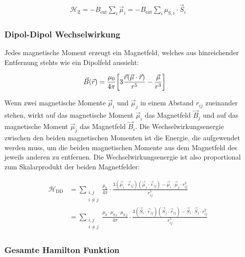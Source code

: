 \documentclass[main.tex]{subfiles}
\begin{document}
\begin{align}
	\mathcal{H}_{\text{Z}} = - B_\text{ext} \sum_{i} \vec{\mu}_i = -
	B_\text{ext} \sum_{i} \mu_{\text{S},i} \cdot \vec{S}_i\label{eq:hamilton-zeeman}
\end{align}

\subsubsection*{Dipol-Dipol Wechselwirkung}

Jedes magnetische Moment erzeugt ein Magnetfeld, welches aus hinreichender
Entfernung stehts wie ein Dipolfeld aussieht:

\begin{align}
	\vec{B}(\vec{r}) & = \frac{\mu_0}{4\pi} \qty[3 \frac{\vec{r}(\vec{\mu}
			\cdot
			\vec{r})}{r^5} -
		\frac{\vec{\mu}}{r^3}]\label{eq:dipolmoment}
\end{align}\cite{Nolting-3-elektrodynamik}

Wenn zwei magnetische Momente \(\vec{\mu}_i\) und \(\vec{\mu}_j\) in einem
Abstand \(r_{ij}\) zueinander stehen, wirkt auf das magnetische Moment
\(\vec{\mu}_i\) das Magnetfeld \(\vec{B}_j\) und auf das magnetische Moment
\(\vec{\mu}_j\) das Magnetfeld \(\vec{B}_i\). Die Wechselwirkungsenergie
zwischen den beiden magnetischen Momenten ist die Energie, die aufgewendet
werden muss, um die beiden magnetischen Momente aus dem Magnetfeld des jeweils
anderen zu entfernen. Die Wechselwirkungsenergie ist also proportional zum
Skalarprodukt der beiden Magnetfelder:

\begin{align}
	\mathcal{H}_{\text{DD}} & = \sum_{\substack{i,j           \\ i \neq j}}
	\frac{\mu_0}{4\pi}
	\cdot  \frac{3(\vec{\mu}_i \cdot \vec{r}_{ij})(\vec{\mu}_j \cdot
		\vec{r}_{ij})
	- \vec{\mu}_i \cdot \vec{\mu}_j \cdot r_{ij}^2}{r_{ij}^5} \\
	                        & = \sum_{\substack{i,j           \\ i \neq j}}
	\frac{\mu_0 \cdot \mu_{\text{S,i}} \cdot \mu_{\text{S,j}}}{4\pi}
	\cdot \frac{3(\vec{S}_i \cdot \vec{r}_{ij})(\vec{S}_j \cdot
		\vec{r}_{ij})
		- \vec{S}_i \cdot \vec{S}_j \cdot r_{ij}^2}{r_{ij}^5}\label{eq:hamilton-dd}
\end{align}

\subsubsection*{Gesamte Hamilton Funktion}
\end{document}
